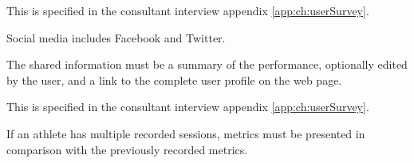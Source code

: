
This  is specified in the consultant interview appendix \ref{app:ch:userSurvey}.

Social media includes Facebook and Twitter.

The shared information must be a summary of the performance, optionally edited by the user, and a link to the complete user profile on the web page.


This  is specified in the consultant interview appendix \ref{app:ch:userSurvey}.

If an athlete has multiple recorded sessions, metrics must be presented in comparison with the previously recorded metrics.
